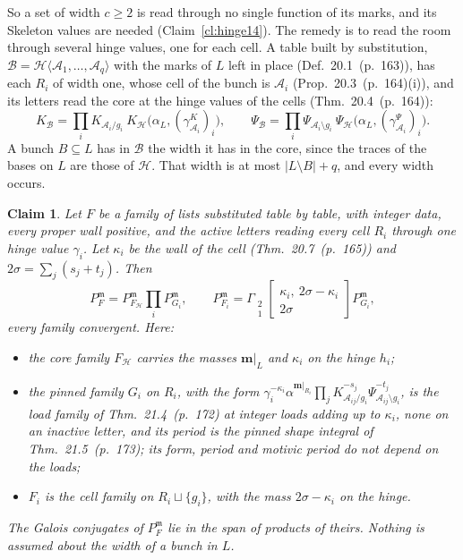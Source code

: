 \documentclass[11pt]{article}
\newcommand{\cB}{\mathcal B}
\newcommand{\mvec}{\mathbf m}
\newcommand{\Gst}[4]{\Gamma_{\substack{#1\\#2}}\!\begin{bmatrix}#3\\#4\end{bmatrix}}
\newcommand{\hb}[2]{#1~(p.~#2)}   %
\theoremstyle{plain}
\newtheorem{claim}{Claim}[section]
\theoremstyle{remark}
\begin{document}
So a set of width $c\ge2$ is read through no single function of its marks, and its Skeleton values are needed (Claim~\ref{cl:hinge14}). The remedy is to read the room through several hinge values, one for each cell. A table built by substitution, $\cB=\mathcal H\langle\mathcal A_1,\dots,\mathcal A_q\rangle$ with the marks of $L$ left in place (Def.~\hb{20.1}{163}), has each $R_i$ of width one, whose cell of the bunch is $\mathcal A_i$ (Prop.~\hb{20.3}{164}(i)), and its letters read the core at the hinge values of the cells (Thm.~\hb{20.4}{164}):
\[
K_{\cB}=\prod_iK_{\mathcal A_i/g_i}\ K_{\mathcal H}\big(\alpha_L,(\gamma^K_{\mathcal A_i})_i\big),\qquad \Psi_{\cB}=\prod_i\Psi_{\mathcal A_i\setminus g_i}\ \Psi_{\mathcal H}\big(\alpha_L,(\gamma^\Psi_{\mathcal A_i})_i\big).
\]
A bunch $B\subseteq L$ has in $\cB$ the width it has in the core, since the traces of the bases on $L$ are those of $\mathcal H$. That width is at most $|L\setminus B|+q$, and every width occurs.

\begin{claim}\label{cl:pinned14}
Let $F$ be a family of lists substituted table by table, with integer data, every proper wall positive, and the active letters reading every cell $R_i$ through one hinge value $\gamma_i$. Let $\kappa_i$ be the wall of the cell (Thm.~\hb{20.7}{165}) and $2\sigma=\sum_j(s_j+t_j)$. Then
\[
P_F^{\mathfrak m}=P^{\mathfrak m}_{F_{\mathcal H}}\prod_iP^{\mathfrak m}_{G_i},\qquad P^{\mathfrak m}_{F_i}=\Gst21{\kappa_i,\ 2\sigma-\kappa_i}{2\sigma}P^{\mathfrak m}_{G_i},
\]
every family convergent. Here:
\begin{itemize}
\item the core family $F_{\mathcal H}$ carries the masses $\mvec|_L$ and $\kappa_i$ on the hinge $h_i$;
\item the pinned family $G_i$ on $R_i$, with the form $\gamma_i^{-\kappa_i}\alpha^{\mvec|_{R_i}}\prod_jK_{\mathcal A_{ij}/g_i}^{-s_j}\Psi_{\mathcal A_{ij}\setminus g_i}^{-t_j}$, is the load family of Thm.~\hb{21.4}{172} at integer loads adding up to $\kappa_i$, none on an inactive letter, and its period is the pinned shape integral of Thm.~\hb{21.5}{173}; its form, period and motivic period do not depend on the loads;
\item $F_i$ is the cell family on $R_i\sqcup\{g_i\}$, with the mass $2\sigma-\kappa_i$ on the hinge.
\end{itemize}
The Galois conjugates of $P_F^{\mathfrak m}$ lie in the span of products of theirs. Nothing is assumed about the width of a bunch in $L$.
\end{claim}
\end{document}
